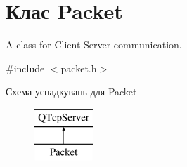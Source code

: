 \hypertarget{classPacket}{\section{Клас Packet}
\label{classPacket}
}


A class for Client-\/\-Server communication.  




{\ttfamily \#include $<$packet.\-h$>$}

Схема успадкувань для Packet\begin{figure}[H]
\begin{center}
\leavevmode
\includegraphics[height=2.000000cm]{classPacket}
\end{center}
\end{figure}
